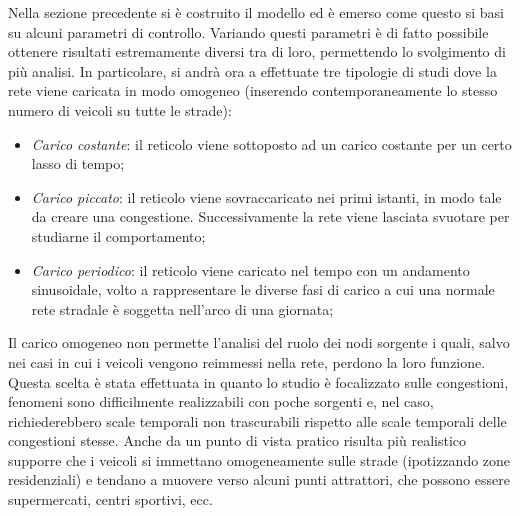 \documentclass[../main.tex]{subfiles}
\begin{document}
Nella sezione precedente si \`e costruito il modello ed \`e emerso come questo si basi su alcuni parametri di controllo.
Variando questi parametri \`e di fatto possibile ottenere risultati estremamente diversi tra di loro, permettendo lo svolgimento di pi\`u analisi.
In particolare, si andr\`a ora a effettuate tre tipologie di studi dove la rete viene caricata in modo omogeneo (inserendo contemporaneamente lo stesso numero di veicoli su tutte le strade):
\begin{itemize}
    \item \emph{Carico costante}: il reticolo viene sottoposto ad un carico costante per un certo lasso di tempo;
    \item \emph{Carico piccato}: il reticolo viene sovraccaricato nei primi istanti, in modo tale da creare una congestione. Successivamente la rete viene lasciata svuotare per studiarne il comportamento;
    \item \emph{Carico periodico}: il reticolo viene caricato nel tempo con un andamento sinusoidale, volto a rappresentare le diverse fasi di carico a cui una normale rete stradale \`e soggetta nell'arco di una giornata;
\end{itemize}
Il carico omogeneo non permette l'analisi del ruolo dei nodi sorgente i quali, salvo nei casi in cui i veicoli vengono reimmessi nella rete, perdono la loro funzione.
Questa scelta \`e stata effettuata in quanto lo studio \`e focalizzato sulle congestioni, fenomeni sono difficilmente realizzabili con poche sorgenti e, nel caso, richiederebbero scale temporali non trascurabili rispetto alle scale temporali delle congestioni stesse.
Anche da un punto di vista pratico risulta pi\`u realistico supporre che i veicoli si immettano omogeneamente sulle strade (ipotizzando zone residenziali) e tendano a muovere verso alcuni punti attrattori, che possono essere supermercati, centri sportivi, ecc.
\end{document}
